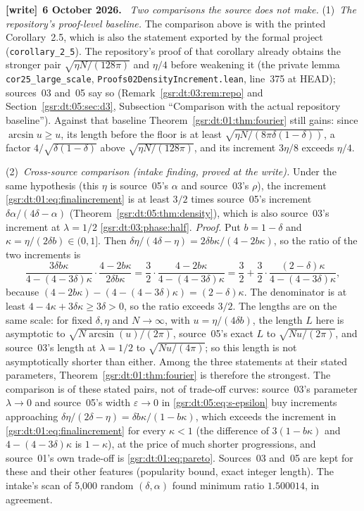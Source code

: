 \documentclass[11pt,letterpaper]{article}
\numberwithin{equation}{section}
\theoremstyle{definition}
\theoremstyle{remark}
\newcommand{\1}{\mathbf 1}
\newcommand{\file}[1]{\nolinkurl{#1}}
\newenvironment{writenote}[1][]{\par\smallskip\begingroup\small
 \noindent\textbf{[write]}\if\relax\detokenize{#1}\relax\else~\textbf{#1.}\fi\ }%
 {\par\endgroup\smallskip}
\begin{document}
\begin{writenote}[6 October 2026]
\emph{Two comparisons the source does not make.} (1)~\emph{The repository's proof-level baseline.} The comparison above is with the printed Corollary~2.5, which is also the statement exported by the formal project (\file{corollary_2_5}). The repository's proof of that corollary already obtains the stronger pair $\sqrt{\eta N/(128\pi)}$ and $\eta/4$ before weakening it (the private lemma \file{cor25_large_scale}, \file{Proofs02DensityIncrement.lean}, line~375 at HEAD); sources~03 and~05 say so (Remark~\ref{gsr:dt:03:rem:repo} and Section~\ref{gsr:dt:05:sec:d3}, Subsection ``Comparison with the actual repository baseline''). Against that baseline Theorem~\ref{gsr:dt:01:thm:fourier} still gains: since $\arcsin u\ge u$, its length before the floor is at least $\sqrt{\eta N/(8\pi\delta(1-\delta))}$, a factor $4/\sqrt{\delta(1-\delta)}$ above $\sqrt{\eta N/(128\pi)}$, and its increment $3\eta/8$ exceeds $\eta/4$.

(2)~\emph{Cross-source comparison (intake finding, proved at the write).} Under the same hypothesis (this $\eta$ is source~05's $\alpha$ and source~03's $\rho$), the increment \eqref{gsr:dt:01:eq:finalincrement} is at least $3/2$ times source~05's increment $\delta\alpha/(4\delta-\alpha)$ (Theorem~\ref{gsr:dt:05:thm:density}), which is also source~03's increment at $\lambda=1/2$ \eqref{gsr:dt:03:phase:half}. \emph{Proof.} Put $b=1-\delta$ and $\kappa=\eta/(2\delta b)\in(0,1]$. Then $\delta\eta/(4\delta-\eta)=2\delta b\kappa/(4-2b\kappa)$, so the ratio of the two increments is
\[
 \frac{3\delta b\kappa}{4-(4-3\delta)\kappa}\cdot\frac{4-2b\kappa}{2\delta b\kappa}
 =\frac32\cdot\frac{4-2b\kappa}{4-(4-3\delta)\kappa}
 =\frac32+\frac32\cdot\frac{(2-\delta)\kappa}{4-(4-3\delta)\kappa},
\]
because $(4-2b\kappa)-(4-(4-3\delta)\kappa)=(2-\delta)\kappa$. The denominator is at least $4-4\kappa+3\delta\kappa\ge3\delta>0$, so the ratio exceeds $3/2$. The lengths are on the same scale: for fixed $\delta,\eta$ and $N\to\infty$, with $u=\eta/(4\delta b)$, the length $L$ here is asymptotic to $\sqrt{N\arcsin(u)/(2\pi)}$, source~05's exact $L$ to $\sqrt{Nu/(2\pi)}$, and source~03's length at $\lambda=1/2$ to $\sqrt{Nu/(4\pi)}$; so this length is not asymptotically shorter than either. Among the three statements at their stated parameters, Theorem~\ref{gsr:dt:01:thm:fourier} is therefore the strongest. The comparison is of these stated pairs, not of trade-off curves: source~03's parameter $\lambda\to0$ and source~05's width $\varepsilon\to0$ in \eqref{gsr:dt:05:eq:s-epsilon} buy increments approaching $\delta\eta/(2\delta-\eta)=\delta b\kappa/(1-b\kappa)$, which exceeds the increment in \eqref{gsr:dt:01:eq:finalincrement} for every $\kappa<1$ (the difference of $3(1-b\kappa)$ and $4-(4-3\delta)\kappa$ is $1-\kappa$), at the price of much shorter progressions, and source~01's own trade-off is \eqref{gsr:dt:01:eq:pareto}. Sources~03 and~05 are kept for these and their other features (popularity bound, exact integer length). The intake's scan of 5,000 random $(\delta,\alpha)$ found minimum ratio $1.500014$, in agreement.
\end{writenote}
\end{document}
